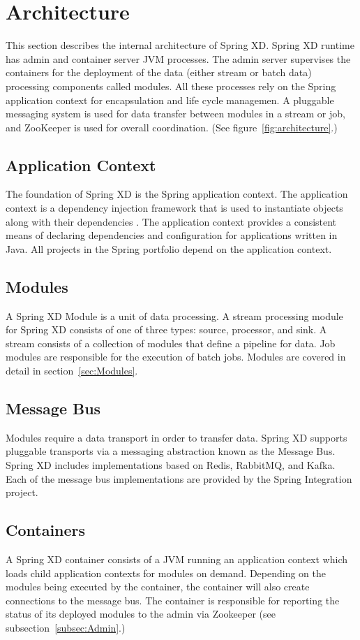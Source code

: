 \section{Architecture}
This section describes the internal architecture of Spring XD. Spring XD
runtime has admin and container server JVM processes. The admin server supervises
the containers for the deployment of the data (either stream or batch data)
processing components called modules. All these processes rely on the
Spring application context for encapsulation and life cycle managemen.
A pluggable messaging system is used for data transfer between modules
in a stream or job, and ZooKeeper is used for overall
coordination. (See figure~\ref{fig:architecture}.)

\subsection{Application Context}
The foundation of Spring XD is the Spring application context. The application
context is a dependency injection framework that is used to instantiate
objects along with their dependencies \cite{spring-framework-reference}.
The application context provides a consistent means of declaring dependencies
and configuration for applications written in Java. All projects in the
Spring portfolio depend on the application context.

\subsection{Modules}
A Spring XD Module is a unit of data processing. A stream processing module
for Spring XD consists of one of three types: source, processor, and sink.
A stream consists of a collection of modules that define a pipeline for data. 
Job modules are responsible for the execution of batch jobs. Modules are
covered in detail in section~\ref{sec:Modules}.

\subsection{Message Bus}
Modules require a data transport in order to transfer data. Spring XD
supports pluggable transports via a messaging abstraction known as 
the Message Bus. Spring XD includes implementations based on Redis, RabbitMQ,
and Kafka. Each of the message bus implementations are provided by the
Spring Integration project.

\subsection{Containers}
A Spring XD container consists of a JVM running an application context which
loads child application contexts for modules on demand. Depending on the modules
being executed by the container, the container will also create connections to
the message bus. The container is responsible for reporting the status of its deployed
modules to the admin via Zookeeper (see subsection~\ref{subsec:Admin}.)

